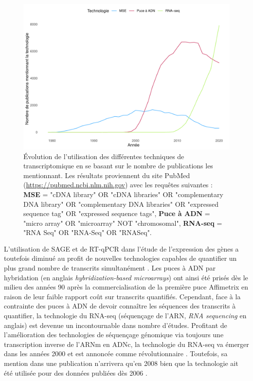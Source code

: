 \begin{figure}[!ht]
    \centering
    \includegraphics[width=\textwidth]{img/intro/count_by_year_rnaseq_microarray_est.pdf}
    \caption[Évolution de l'utilisation des différentes techniques de transcriptomique en se basant sur le nombre de publications les mentionnant]{Évolution de l'utilisation des différentes techniques de transcriptomique en se basant sur le nombre de publications les mentionnant. Les résultats proviennent du site PubMed (\url{https://pubmed.ncbi.nlm.nih.gov}) avec les requêtes suivantes : \textbf{MSE} = "cDNA library" OR "cDNA libraries" OR "complementary DNA library" OR "complementary DNA libraries" OR "expressed sequence tag" OR "expressed sequence tags", \textbf{Puce à ADN} = "micro array" OR "microarray" NOT "chromosomal", \textbf{RNA-seq} = "RNA Seq" OR "RNA-Seq" OR "RNASeq".}
    \label{fig:count_by_year_rnaseq_microarray_est}
\end{figure}


L'utilisation de SAGE et de RT-qPCR dans l'étude de l'expression des gènes a toutefois diminué au profit de nouvelles technologies capables de quantifier un plus grand nombre de transcrits simultanément \cite{Lowe2017May}. Les puces à ADN par hybridation (en anglais \textit{hybridization-based microarrays}) ont ainsi été prisés dès le milieu des années 90 \cite{Schena1995Oct} après la commercialisation de la première puce Affimetrix \cite{Lenoir2006} en raison de leur faible rapport coût sur transcrits quantifiés. Cependant, face à la contrainte des puces à ADN de devoir connaître les séquences des transcrits à quantifier, la technologie du RNA-seq  (séquençage de l'ARN, \textit{RNA sequencing} en anglais) est devenue un incontournable dans nombre d'études. 
Profitant de l'amélioration des technologies de séquençage génomique via toujours une transcription inverse de l'ARNm en ADNc, la technologie du RNA-seq va émerger dans les années 2000 et est annoncée comme révolutionnaire \cite{Wang2009Jan}. Toutefois, sa mention dans une publication n'arrivera qu'en 2008 \cite{Nagalakshmi2008Jun} bien que la technologie ait été utilisée pour des données publiées dès 2006 \cite{Cheung2006Dec}.

